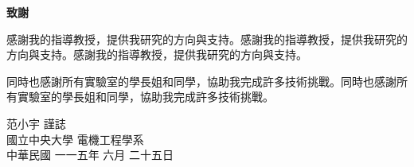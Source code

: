 \begin{center}
	\LARGE {\textbf{致謝}}
\end{center}

\bigskip  %
感謝我的指導教授，提供我研究的方向與支持。感謝我的指導教授，提供我研究的方向與支持。感謝我的指導教授，提供我研究的方向與支持。

\bigskip %
同時也感謝所有實驗室的學長姐和同學，協助我完成許多技術挑戰。同時也感謝所有實驗室的學長姐和同學，協助我完成許多技術挑戰。

\vspace{3em}

\begin{flushright}
范小宇 \qquad 謹誌 \\
國立中央大學 \quad 電機工程學系\\
中華民國 \quad 一一五年 六月 二十五日
\end{flushright}